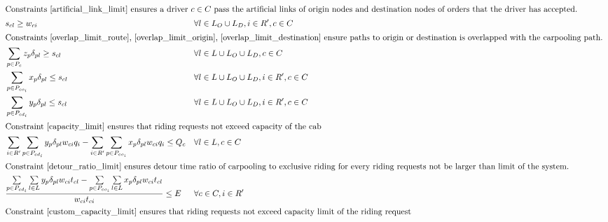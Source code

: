 \begin{align}
  \intertext{Constraints \eqref{artificial_link_limit} ensures a driver $c \in C$ pass the artificial links of origin nodes and destination nodes of orders that the driver has accepted. }
  & s_{cl} \geq w_{ci}             && \forall l \in L_O \cup L_D, i \in R', c \in C \label{artificial_link_limit} \\
  \intertext{Constraints \eqref{overlap_limit_route}, \eqref{overlap_limit_origin}, \eqref{overlap_limit_destination} ensure paths to origin or destination is overlapped with the carpooling path. }
  & \sum\limits_{p \in P_{c}} z_{p} \delta_{pl} \geq s_{cl} && \forall l \in L \cup L_O \cup L_D, c \in C \label{overlap_limit_route} \\
  & \sum\limits_{p \in P_{co_i}} x_{p} \delta_{pl} \leq s_{cl} && \forall l \in L \cup L_O \cup L_D, i \in R', c \in C \label{overlap_limit_origin} \\
  & \sum\limits_{p \in P_{cd_i}} y_{p} \delta_{pl} \leq s_{cl} && \forall l \in L \cup L_O \cup L_D, i \in R', c \in C \label{overlap_limit_destination} \\
  \intertext{Constraint \eqref{capacity_limit} ensures that riding requests not exceed capacity of the cab}
  & \sum\limits_{i \in R'} \sum\limits_{p \in P_{cd_i}} y_{p} \delta_{pl} w_{ci} q_i - \sum\limits_{i \in R'} \sum\limits_{p \in P_{co_i}} x_{p} \delta_{pl} w_{ci} q_i \leq Q_c && \forall l \in L, c \in C \label{capacity_limit} \\
  \intertext{Constraint \eqref{detour_ratio_limit} ensures detour time ratio of carpooling to exclusive riding for every riding requests not be larger than limit of the system.}
  & \frac{\sum\limits_{p \in P_{cd_i}} \sum\limits_{l \in L} y_{p} \delta_{pl} w_{ci} t_{cl} - \sum\limits_{p \in P_{co_i}} \sum\limits_{l \in L} x_{p} \delta_{pl} w_{ci} t_{cl}}{w_{ci} t_{ci}} \leq E && \forall c \in C, i \in R' \label{detour_ratio_limit} \\
  \intertext{Constraint \eqref{custom_capacity_limit} ensures that riding requests not exceed capacity limit of the riding request}

\end{align}
